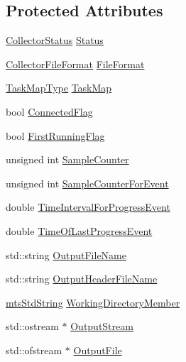 \subsection*{Protected Attributes}
\begin{DoxyCompactItemize}
\item 
\hyperlink{group__cisst_multi_task_gadfbc058665584a56933a7997229c1fb6}{Collector\+Status} \hyperlink{classmts_collector_base_ae5b1e57c993774b77da77f1e1fc7d73c}{Status}
\item 
\hyperlink{group__cisst_multi_task_gaa228bed8144053d0bfa316f9ac9d0901}{Collector\+File\+Format} \hyperlink{classmts_collector_base_a5afbc705a454a6e1394ff4bfd1c17774}{File\+Format}
\item 
\hyperlink{classmts_collector_base_a6b47b3df8797f600ac9791640561f035}{Task\+Map\+Type} \hyperlink{classmts_collector_base_a4e9b221e6cdeb2fbddaf44ffbe9e3b0e}{Task\+Map}
\item 
bool \hyperlink{classmts_collector_base_a68e1ba8a88b403471103ad596fd3f002}{Connected\+Flag}
\item 
bool \hyperlink{classmts_collector_base_abed8163d5f91e30ac10344e82c405cd7}{First\+Running\+Flag}
\item 
unsigned int \hyperlink{classmts_collector_base_a08c8c1889a10cba359bc799bbf5d218b}{Sample\+Counter}
\item 
unsigned int \hyperlink{classmts_collector_base_a199b6fdd92f3a5912b6d7fd10af5b205}{Sample\+Counter\+For\+Event}
\item 
double \hyperlink{classmts_collector_base_ab6c33b31e4651991098cd0963a575d24}{Time\+Interval\+For\+Progress\+Event}
\item 
double \hyperlink{classmts_collector_base_aa33295c29dd9bc683cb95a9f57c5a09e}{Time\+Of\+Last\+Progress\+Event}
\item 
std\+::string \hyperlink{classmts_collector_base_a86248c53c5807c8b9a21b232d89b26dd}{Output\+File\+Name}
\item 
std\+::string \hyperlink{classmts_collector_base_adf377242f1cf745ccedf71f6505d1095}{Output\+Header\+File\+Name}
\item 
\hyperlink{mts_generic_object_proxy_8h_adbc21bfbf98367e582bf8a263b7e711f}{mts\+Std\+String} \hyperlink{classmts_collector_base_a1af964c915eb2090cc72a8515dcbea6d}{Working\+Directory\+Member}
\item 
std\+::ostream $\ast$ \hyperlink{classmts_collector_base_a4901f9bf045081f0d79ada98fb06c57b}{Output\+Stream}
\item 
std\+::ofstream $\ast$ \hyperlink{classmts_collector_base_a7072747db6ae6fb544364d8fe11f741d}{Output\+File}

\end{DoxyCompactItemize}
